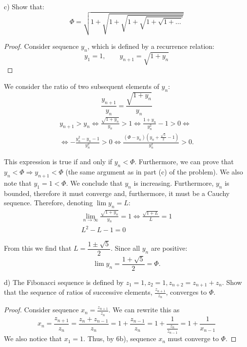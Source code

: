\documentclass{article}
\begin{document}
\begin{tcolorbox}
c) Show that:
\[ \Phi = \sqrt{1+\sqrt{1+\sqrt{1+\sqrt{1+\sqrt{1+\dots}}}}} \]
\end{tcolorbox}

\begin{proof}
Consider sequence $y_n$, which is defined by a recurrence relation:
\[ y_1 = 1, \quad\quad y_{n+1} = \sqrt{1 + y_n} \]
\end{proof}

We consider the ratio of two subsequent elements of $y_n$:
\[ \frac{y_{n+1}}{y_n} = \frac{\sqrt{1+y_n}}{y_n} \]
\begin{multline*}
    y_{n+1} > y_n \iff \frac{\sqrt{1+y_n}}{y_n} > 1 \iff \frac{1+y_n}{y_n^2} -1 > 0 \iff \\
    \iff -\frac{y_n^2-y_n-1}{y_n^2} > 0 \iff \frac{(\Phi-y_n)(y_n+\frac{\sqrt{5}}{2}-1)}{y_n^2} > 0. 
\end{multline*}

This expression is true if and only if $y_n < \Phi$.
Furthermore, we can prove that $y_n < \Phi \Rightarrow y_{n+1} < \Phi$ (the same argument as in part (c) of the problem).
We also note that $y_1 = 1 < \Phi$.
We conclude that $y_n$ is increasing.
Furthermore, $y_n$ is bounded, therefore it must converge and, furthermore, it must be a Cauchy sequence.
Therefore, denoting $\lim y_n = L$:
\begin{gather*}
    \lim_{n \to \infty} \frac{\sqrt{1+y_n}}{y_n} = 1 \iff \frac{\sqrt{1+L}}{L} = 1 \\
    L^2 - L - 1 = 0    
\end{gather*}

From this we find that $L = \dfrac{1 \pm \sqrt{5}}{2}$. Since all $y_n$ are positive:
\[ \lim y_n = \dfrac{1+\sqrt{5}}{2} = \Phi. \]

\begin{tcolorbox}
d) The Fibonacci sequence is defined by $z_1 = 1, z_2 = 1, z_{n+2} = z_{n+1} + z_n$.
Show that the sequence of ratios of successive elements, $\frac{z_{n+1}}{z_n}$, converges to $\Phi$.
\end{tcolorbox}

\begin{proof}

Consider sequence $x_n = \frac{z_{n+1}}{z_n}$.
We can rewrite this as
\[ x_n = \frac{z_{n+1}}{z_n} = \frac{z_{n}+z_{n-1}}{z_n} = 1 + \frac{z_{n-1}}{z_n} = 1 + \frac{1}{\frac{z_n}{z_{n-1}}} = 1+\frac{1}{x_{n-1}} \]
We also notice that $x_1 = 1$.
Thus, by 6b), sequence $x_n$ must converge to $\Phi$.

\end{proof}
\end{document}
